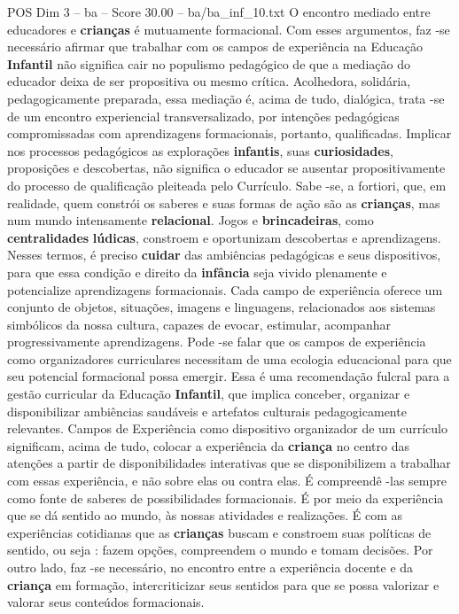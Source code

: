 \begin{textsample}{POS Dim 3 – ba – Score 30.00 – ba/ba\_inf\_10.txt}
O encontro mediado entre educadores e \textbf{crianças} é mutuamente formacional.
Com esses argumentos, faz -se necessário afirmar que trabalhar com os campos de experiência na Educação \textbf{Infantil} não significa cair no populismo pedagógico de que a mediação do educador deixa de ser propositiva ou mesmo crítica.
Acolhedora, solidária, pedagogicamente preparada, essa mediação é, acima de tudo, dialógica, trata -se de um encontro experiencial transversalizado, por intenções pedagógicas compromissadas com aprendizagens formacionais, portanto, qualificadas.
Implicar nos processos pedagógicos as explorações \textbf{infantis}, suas \textbf{curiosidades}, proposições e descobertas, não significa o educador se ausentar propositivamente do processo de qualificação pleiteada pelo Currículo.
Sabe -se, a fortiori, que, em realidade, quem constrói os saberes e suas formas de ação são as \textbf{crianças}, mas num mundo intensamente \textbf{relacional}.
Jogos e \textbf{brincadeiras}, como \textbf{centralidades} \textbf{lúdicas}, constroem e oportunizam descobertas e aprendizagens.
Nesses termos, é preciso \textbf{cuidar} das ambiências pedagógicas e seus dispositivos, para que essa condição e direito da \textbf{infância} seja vivido plenamente e potencialize aprendizagens formacionais.
Cada campo de experiência oferece um conjunto de objetos, situações, imagens e linguagens, relacionados aos sistemas simbólicos da nossa cultura, capazes de evocar, estimular, acompanhar progressivamente aprendizagens.
Pode -se falar que os campos de experiência como organizadores curriculares necessitam de uma ecologia educacional para que seu potencial formacional possa emergir.
Essa é uma recomendação fulcral para a gestão curricular da Educação \textbf{Infantil}, que implica conceber, organizar e disponibilizar ambiências saudáveis e artefatos culturais pedagogicamente relevantes.
Campos de Experiência como dispositivo organizador de um currículo significam, acima de tudo, colocar a experiência da \textbf{criança} no centro das atenções a partir de disponibilidades interativas que se disponibilizem a trabalhar com essas experiência, e não sobre elas ou contra elas.
É compreendê -las sempre como fonte de saberes de possibilidades formacionais.
É por meio da experiência que se dá sentido ao mundo, às nossas atividades e realizações.
É com as experiências cotidianas que as \textbf{crianças} buscam e constroem suas políticas de sentido, ou seja : fazem opções, compreendem o mundo e tomam decisões.
Por outro lado, faz -se necessário, no encontro entre a experiência docente e da \textbf{criança} em formação, intercriticizar seus sentidos para que se possa valorizar e valorar seus conteúdos formacionais.

\end{textsample}
